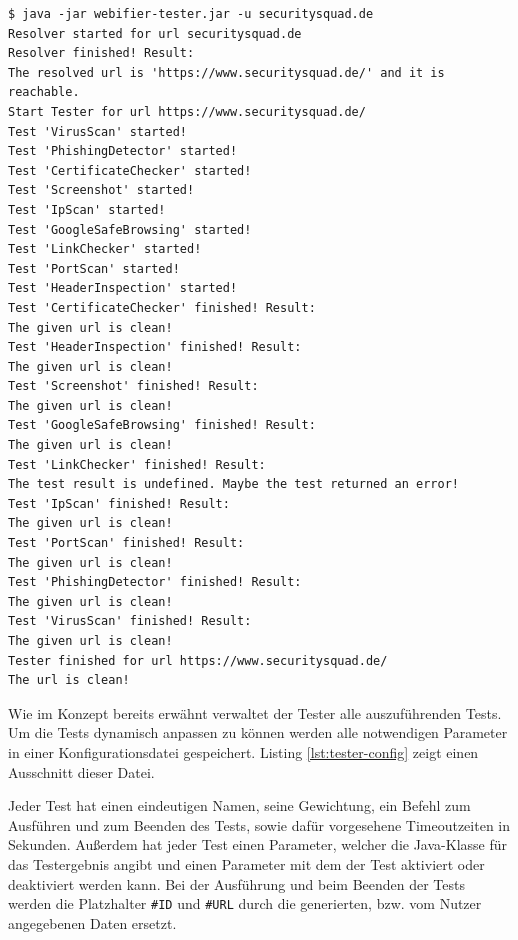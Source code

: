 \newpage

\begin{scriptsize}
\begin{lstlisting}
$ java -jar webifier-tester.jar -u securitysquad.de
Resolver started for url securitysquad.de
Resolver finished! Result:
The resolved url is 'https://www.securitysquad.de/' and it is reachable.
Start Tester for url https://www.securitysquad.de/
Test 'VirusScan' started!
Test 'PhishingDetector' started!
Test 'CertificateChecker' started!
Test 'Screenshot' started!
Test 'IpScan' started!
Test 'GoogleSafeBrowsing' started!
Test 'LinkChecker' started!
Test 'PortScan' started!
Test 'HeaderInspection' started!
Test 'CertificateChecker' finished! Result:
The given url is clean!
Test 'HeaderInspection' finished! Result:
The given url is clean!
Test 'Screenshot' finished! Result:
The given url is clean!
Test 'GoogleSafeBrowsing' finished! Result:
The given url is clean!
Test 'LinkChecker' finished! Result:
The test result is undefined. Maybe the test returned an error!
Test 'IpScan' finished! Result:
The given url is clean!
Test 'PortScan' finished! Result:
The given url is clean!
Test 'PhishingDetector' finished! Result:
The given url is clean!
Test 'VirusScan' finished! Result:
The given url is clean!
Tester finished for url https://www.securitysquad.de/
The url is clean!
\end{lstlisting}
\end{scriptsize}

Wie im Konzept bereits erwähnt verwaltet der Tester alle auszuführenden Tests. Um die Tests dynamisch anpassen zu können werden alle notwendigen Parameter in einer Konfigurationsdatei gespeichert. Listing \ref{lst:tester-config} zeigt einen Ausschnitt dieser Datei.

Jeder Test hat einen eindeutigen Namen, seine Gewichtung, ein Befehl zum Ausführen und zum Beenden des Tests, sowie dafür vorgesehene Timeoutzeiten in Sekunden. Außerdem hat jeder Test einen Parameter, welcher die Java-Klasse für das Testergebnis angibt und einen Parameter mit dem der Test aktiviert oder deaktiviert werden kann. Bei der Ausführung und beim Beenden der Tests werden die Platzhalter \lstinline[style=eclipse]{#ID} und \lstinline[style=eclipse]{#URL} durch die generierten, bzw. vom Nutzer angegebenen Daten ersetzt.

\newpage

